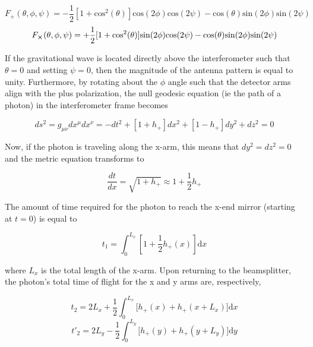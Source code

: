 	\begin{equation}\label{Fplus}
	F_{+}(\theta,\phi,\psi) = -\frac{1}{2}[1+\text{cos}^2(\theta)] \text{cos}(2\phi) \text{cos}(2\psi) - \text{cos}(\theta) \text{sin}(2\phi) \text{sin}(2\psi)
	\end{equation}
	\begin{equation}\label{Fcross}
	F_{\cross}(\theta,\phi,\psi) = + \frac{1}{2}[1+\text{cos}^2(\theta)] \text{sin}(2\phi) \text{cos}(2\psi) - \text{cos}(\theta) \text{sin}(2\phi) \text{sin}(2\psi)
	\end{equation}
	
	If the gravitational wave is located directly above the interferometer such that $\theta = 0$ and setting $\psi=0$, then the magnitude of the antenna pattern is equal to unity.  Furthermore, by rotating about the $\phi$ angle such that the detector arms align with the plus polarization, the null geodesic equation (ie the path of a photon) in the interferometer frame becomes 
	
	\begin{equation}
	ds^2 = g_{\mu\nu}dx^{\mu} dx^{\nu} = -dt^2 + [1+h_{+}]  dx^2 + [1-h_{+}]  dy^2 + dz^2 = 0
	\end{equation}
	
	Now, if the photon is traveling along the x-arm, this means that $dy^2 = dz^2 = 0$ and the metric equation transforms to
	
	\begin{equation}
	\frac{dt}{dx} = \sqrt{ 1+h_{+} } \approx 1+\frac{1}{2} h_{+} 
	\end{equation}
	
	The amount of time required for the photon to reach the x-end mirror (starting at $t=0$) is equal to
	
	\begin{equation}\label{pathlength}
	t_1 = \int_{0}^{L_{x}} [1+\frac{1}{2}  h_{+}(x) ] \text{d}x
	\end{equation}
	
	where $L_x$ is the total length of the x-arm.  Upon returning to the beamsplitter, the photon's total time of flight for the x and y arms are, respectively,
	
	\begin{equation}
	t_2 = 2 L_x + \frac{1}{2} \int_{0}^{L_x} \bigg[  h_{+}(x) +  h_{+}(x + L_x)  \bigg] \text{d}x
	\end{equation}
	\begin{equation}
	t'_{2}= 2 L_y - \frac{1}{2} \int_{0}^{L_y} \bigg[  h_{+}(y) +  h_{+}(y + L_y)  \bigg] \text{d}y
	\end{equation}
	
